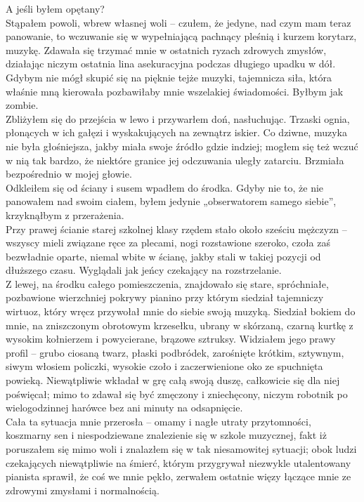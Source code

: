 \documentclass[../MAIN.tex]{subfiles}
\begin{document}
A jeśli byłem opętany?\\
Stąpałem powoli, wbrew własnej woli -- czułem, że jedyne, nad czym mam teraz panowanie, to wczuwanie się w wypełniającą pachnący pleśnią i kurzem korytarz, muzykę. Zdawała się trzymać mnie w ostatnich ryzach zdrowych zmysłów, działając niczym ostatnia lina asekuracyjna podczas długiego upadku w dół. Gdybym nie mógł skupić się na pięknie tejże muzyki, tajemnicza siła, która właśnie mną kierowała pozbawiłaby mnie wszelakiej świadomości. Byłbym jak zombie.\\
Zbliżyłem się do przejścia w lewo i przywarłem doń, nasłuchując. Trzaski ognia, płonących w ich gałęzi i wyskakujących na zewnątrz iskier. Co dziwne, muzyka nie była głośniejsza, jakby miała swoje źródło gdzie indziej; mogłem się też wczuć w nią tak bardzo, że niektóre granice jej odczuwania uległy zatarciu. Brzmiała bezpośrednio w mojej głowie.\\
Odkleiłem się od ściany i susem wpadłem do środka. Gdyby nie to, że nie panowałem nad swoim ciałem, byłem jedynie „obserwatorem samego siebie”, krzyknąłbym z przerażenia.\\
Przy prawej ścianie starej szkolnej klasy rzędem stało około sześciu mężczyzn -- wszyscy mieli związane ręce za plecami, nogi rozstawione szeroko, czoła zaś bezwładnie oparte, niemal wbite w ścianę, jakby stali w takiej pozycji od dłuższego czasu. Wyglądali jak jeńcy czekający na rozstrzelanie.\\
Z lewej, na środku całego pomieszczenia, znajdowało się stare, spróchniałe, pozbawione wierzchniej pokrywy pianino przy którym siedział tajemniczy wirtuoz, który wręcz przywołał mnie do siebie swoją muzyką. Siedział bokiem do mnie, na zniszczonym obrotowym krzesełku, ubrany w skórzaną, czarną kurtkę z wysokim kołnierzem i powycierane, brązowe sztruksy. Widziałem jego prawy profil -- grubo ciosaną twarz, płaski podbródek, zarośnięte krótkim, sztywnym, siwym włosiem policzki, wysokie czoło i zaczerwienione oko ze spuchnięta powieką. Niewątpliwie wkładał w grę całą swoją duszę, całkowicie się dla niej poświęcał; mimo to zdawał się być zmęczony i zniechęcony, niczym robotnik po wielogodzinnej harówce bez ani minuty na odsapnięcie.\\
Cała ta sytuacja mnie przerosła -- omamy i nagłe utraty przytomności, koszmarny sen i niespodziewane znalezienie się w szkole muzycznej, fakt iż poruszałem się mimo woli i znalazłem się w tak niesamowitej sytuacji; obok ludzi czekających niewątpliwie na śmierć, którym przygrywał niezwykle utalentowany pianista sprawił, że coś we mnie pękło, zerwałem ostatnie więzy łączące mnie ze zdrowymi zmysłami i normalnością.\\
\end{document}
